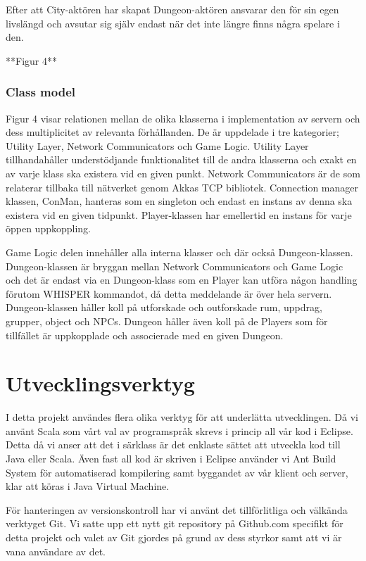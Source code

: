 \documentclass[a4paper]{article}
\begin{document}
Efter att City-aktören har skapat Dungeon-aktören ansvarar den för sin egen livslängd och avsutar sig själv endast när det inte längre finns några spelare i den.

**Figur 4**

\subsubsection{Class model}
Figur 4 visar relationen mellan de olika klasserna i implementation av servern och dess multiplicitet av relevanta förhållanden. 
De är uppdelade i tre kategorier; Utility Layer, Network Communicators och Game Logic. 
Utility Layer tillhandahåller understödjande funktionalitet till de andra klasserna och exakt en av varje klass ska existera vid en given punkt. 
Network Communicators är de som relaterar tillbaka till nätverket genom Akkas TCP bibliotek. Connection manager klassen, ConMan, hanteras som en singleton och endast en 
instans av denna ska existera vid en given tidpunkt. Player-klassen har emellertid en instans för varje öppen uppkoppling.

Game Logic delen innehåller alla interna klasser och där också Dungeon-klassen. Dungeon-klassen är bryggan mellan Network 
Communicators och Game Logic och det är endast via en Dungeon-klass som en Player kan utföra någon handling förutom WHISPER kommandot, 
då detta meddelande är över hela servern. Dungeon-klassen håller koll på utforskade och outforskade rum, uppdrag, grupper, object och NPCs. 
Dungeon håller även koll på de Players som för tillfället är uppkopplade och associerade med en given Dungeon.

\section{Utvecklingsverktyg}

I detta projekt användes flera olika verktyg för att underlätta utvecklingen. Då vi använt Scala som vårt val av programspråk skrevs i princip all vår kod i Eclipse. 
Detta då vi anser att det i särklass är det enklaste sättet att utveckla kod till Java eller Scala. Även fast all kod är skriven i Eclipse använder vi Ant Build System 
för automatiserad kompilering samt byggandet av vår klient och server, klar att köras i Java Virtual Machine. 

För hanteringen av versionskontroll har vi använt det tillförlitliga och välkända verktyget Git. Vi satte upp ett nytt git repository på Github.com specifikt för detta 
projekt och valet av Git gjordes på grund av dess styrkor samt att vi är vana användare av det.
\end{document}
